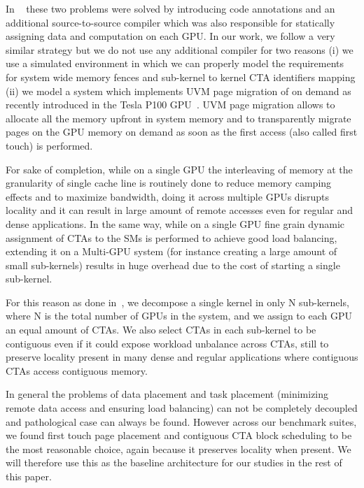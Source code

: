 In ~\cite{Cabezas2015} these two problems were solved by introducing  
code annotations and an additional source-to-source compiler which was also 
responsible for statically assigning data and computation on each GPU. In our 
work, we follow a very similar strategy but we do not use any additional 
compiler for two reasons (i) we use a simulated environment in which 
we can properly model the requirements for system wide memory fences 
and sub-kernel to kernel CTA identifiers mapping (ii) we model a system 
which implements UVM page migration of on demand as recently introduced in the 
Tesla P100 GPU~\cite{P100}. UVM page migration allows to allocate 
all the memory upfront in system memory and to transparently migrate pages 
on the GPU memory on demand as soon as the first access (also called first 
touch) 
is performed.

For sake of completion, while on a single GPU the interleaving of memory at 
the granularity of single cache line is routinely done to reduce memory 
camping effects and to maximize bandwidth, doing it across multiple GPUs 
disrupts locality and it can result in large amount of remote accesses even 
for regular and dense applications. In the same way, while on a single GPU 
fine grain dynamic assignment of CTAs to the SMs is performed to achieve good 
load balancing, extending it on a Multi-GPU system (for instance creating a 
large amount of small sub-kernels) results in huge overhead due to the cost 
of starting a single sub-kernel.

For this reason as done in~\cite{Cabezas2015}, we decompose a single kernel 
in only N sub-kernels, where N is the total number of GPUs in the system, and 
we assign to each GPU an equal amount of CTAs. We also select CTAs in each 
sub-kernel to be contiguous even if it could expose workload unbalance across 
CTAs, still to preserve locality present in many dense and regular applications 
where contiguous CTAs access contiguous memory. 

In general the problems of data placement and task placement (minimizing 
remote data access and ensuring load balancing) can not be completely 
decoupled and pathological case can always be found.
However across our benchmark suites, we found first touch page placement and 
contiguous CTA block scheduling to be the most reasonable choice, 
again because it preserves locality when present. We will therefore use this 
as the baseline architecture for our studies in the rest of this paper.

